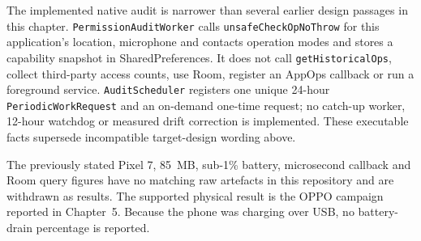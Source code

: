 The implemented native audit is narrower than several earlier design passages in this chapter. \texttt{PermissionAuditWorker} calls \texttt{unsafeCheckOpNoThrow} for this application's location, microphone and contacts operation modes and stores a capability snapshot in SharedPreferences. It does not call \texttt{getHistoricalOps}, collect third-party access counts, use Room, register an AppOps callback or run a foreground service. \texttt{AuditScheduler} registers one unique 24-hour \texttt{PeriodicWorkRequest} and an on-demand one-time request; no catch-up worker, 12-hour watchdog or measured drift correction is implemented. These executable facts supersede incompatible target-design wording above.

The previously stated Pixel 7, 85~MB, sub-1\% battery, microsecond callback and Room query figures have no matching raw artefacts in this repository and are withdrawn as results. The supported physical result is the OPPO campaign reported in Chapter~5. Because the phone was charging over USB, no battery-drain percentage is reported.
